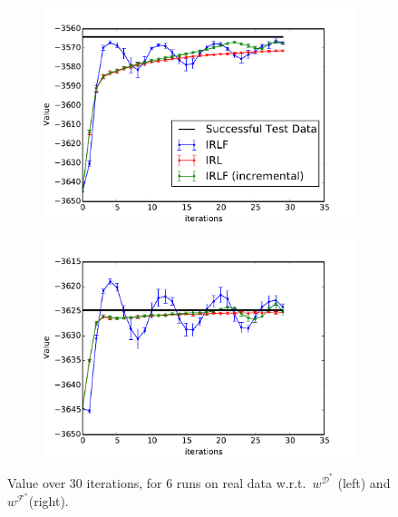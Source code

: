 \documentclass{aamas2016}
\begin{document}
\begin{figure}[h!]
	\hspace{-5mm}
  \begin{subfigure}[b]{0.495\columnwidth}
    \includegraphics[trim=0.5cm 0.5cm 0.2cm 0.2,clip=true,width=1.15\textwidth]{images/expert_apprentice_real.pdf}
    \label{fig:real_expert_apprentice}
  \end{subfigure}
  \hspace{2mm}
  \begin{subfigure}[b]{0.495\columnwidth}
    \includegraphics[trim=0.5cm 0.5cm 0.2cm 0.2,clip=true,width=1.15\textwidth]{images/taboo_apprentice_real.pdf}
    \label{fig:real_taboo_apprentice}
  \end{subfigure}  
  \caption{\small{Value over 30 iterations, for 6 runs on real data w.r.t.\ $w^{\mathcal{D}^*}$ (left) and $w^{\mathcal{F}^*}$(right).}}
  \label{fig:real_data}
\end{figure}
\end{document}
